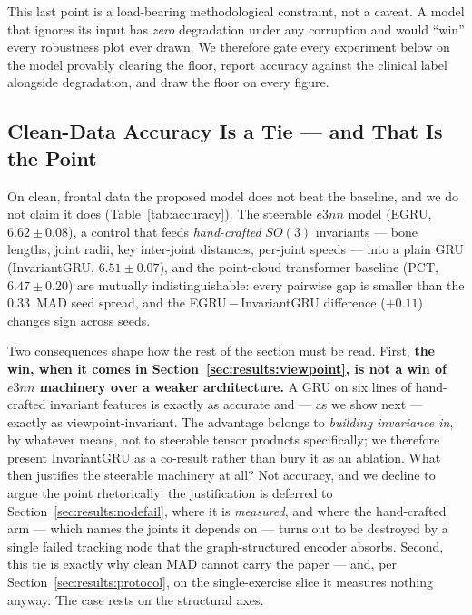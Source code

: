 This last point is a load-bearing methodological constraint, not a caveat. A model that ignores its
input has \emph{zero} degradation under any corruption and would ``win'' every robustness plot ever
drawn. We therefore gate every experiment below on the model provably clearing the floor, report
accuracy against the clinical label alongside degradation, and draw the floor on every figure.

\subsection{Clean-Data Accuracy Is a Tie --- and That Is the Point}
\label{sec:results:accuracy}

On clean, frontal data the proposed model does not beat the baseline, and we do not claim it does
(Table~\ref{tab:accuracy}). The steerable $e3nn$ model (EGRU, $6.62\pm0.08$), a control that feeds
\emph{hand-crafted} $SO(3)$ invariants --- bone lengths, joint radii, key inter-joint distances,
per-joint speeds --- into a plain GRU (InvariantGRU, $6.51\pm0.07$), and the point-cloud transformer
baseline (PCT, $6.47\pm0.20$) are mutually indistinguishable: every pairwise gap is smaller than the
$0.33$~MAD seed spread, and the EGRU\,$-$\,InvariantGRU difference ($+0.11$) changes sign across
seeds.

Two consequences shape how the rest of the section must be read. First, \textbf{the win, when it
comes in Section~\ref{sec:results:viewpoint}, is not a win of $e3nn$ machinery over a weaker
architecture.} A GRU on six lines of hand-crafted invariant features is exactly as accurate and ---
as we show next --- exactly as viewpoint-invariant. The advantage belongs to \emph{building
invariance in}, by whatever means, not to steerable tensor products specifically; we therefore
present InvariantGRU as a co-result rather than bury it as an ablation. What then justifies the
steerable machinery at all? Not accuracy, and we decline to argue the point rhetorically: the
justification is deferred to Section~\ref{sec:results:nodefail}, where it is \emph{measured}, and
where the hand-crafted arm --- which names the joints it depends on --- turns out to be destroyed by
a single failed tracking node that the graph-structured encoder absorbs. Second, this tie is exactly
why clean MAD cannot carry the paper --- and, per Section~\ref{sec:results:protocol}, on the
single-exercise slice it measures nothing anyway. The case rests on the structural axes.

